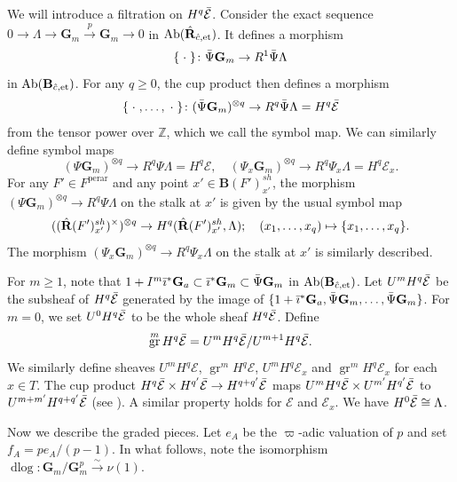 \documentclass{amsart}
\theoremstyle{remark}
\numberwithin{equation}{subsection}
\newcommand{\isomto}{\overset{\sim}{\to}}
\newcommand{\tensor}{\mathbin{\otimes}}
\newcommand{\Z}{\mathbb{Z}}
\newcommand{\et}{\mathrm{et}}
\newcommand{\Gm}{\mathbf{G}_{m}}
\newcommand{\Ga}{\mathbf{G}_{a}}
\newcommand{\perar}{\mathrm{perar}}
\newcommand{\alg}[1]{\mathbf{#1}}
\newcommand{\var}{\;\cdot\;}
\DeclareMathOperator{\Ab}{Ab}
\DeclareMathOperator{\gr}{gr}
\DeclareMathOperator{\dlog}{dlog}
\begin{document}
We will introduce a filtration on $H^{q} \Bar{\mathcal{E}}$.
Consider the exact sequence
$0 \to \Lambda \to \Gm \stackrel{p}{\to} \Gm \to 0$
in $\Ab(\Hat{\alg{R}}_{\Hat{c}, \et})$.
It defines a morphism
	\[
			\{\var\}
		\colon
			\Bar{\Psi} \Gm
		\to
			R^{1} \Bar{\Psi} \Lambda
	\]
in $\Ab(\alg{B}_{\Hat{c}, \et})$.
For any $q \ge 0$, the cup product then defines a morphism
	\[
			\{\var, \dots, \var\}
		\colon
			(\Bar{\Psi} \Gm)^{\tensor q}
		\to
			R^{q} \Bar{\Psi} \Lambda
		=
			H^{q} \Bar{\mathcal{E}}
	\]
from the tensor power over $\Z$,
which we call the symbol map.
We can similarly define symbol maps
	\[
				(\Psi \Gm)^{\tensor q}
			\to
				R^{q} \Psi \Lambda
			=
				H^{q} \mathcal{E},
		\quad
				(\Psi_{x} \Gm)^{\tensor q}
			\to
				R^{q} \Psi_{x} \Lambda
			=
				H^{q} \mathcal{E}_{x}.
	\]
For any $F' \in F^{\perar}$ and any point $x' \in \alg{B}(F')_{x'}^{sh}$,
the morphism $(\Psi \Gm)^{\tensor q} \to R^{q} \Psi \Lambda$ on the stalk at $x'$
is given by the usual symbol map
	\[
			((\Hat{\alg{R}}(F')_{x'}^{sh})^{\times})^{\tensor q}
		\to
			H^{q}(\Hat{\alg{R}}(F')_{x'}^{sh}, \Lambda);
		\quad
			(x_{1}, \dots, x_{q})
		\mapsto
			\{x_{1}, \dots, x_{q}\}.
	\]
The morphism $(\Psi_{x} \Gm)^{\tensor q} \to R^{q} \Psi_{x} \Lambda$ on the stalk at $x'$
is similarly described.

For $m \ge 1$, note that
$1 + I^{m} \Bar{\imath}^{\ast} \Ga \subset \Bar{\imath}^{\ast} \Gm \subset \Bar{\Psi} \Gm$
in $\Ab(\alg{B}_{\Hat{c}, \et})$.
Let $U^{m} H^{q} \Bar{\mathcal{E}}$ be the subsheaf of $H^{q} \Bar{\mathcal{E}}$
generated by the image of
$\{1 + \Bar{\imath}^{\ast} \Ga, \Bar{\Psi} \Gm, \dots, \Bar{\Psi} \Gm\}$.
For $m = 0$, we set $U^{0} H^{q} \Bar{\mathcal{E}}$ to be the whole sheaf $H^{q} \Bar{\mathcal{E}}$.
Define
	\[
			\gr^{m} H^{q} \Bar{\mathcal{E}}
		=
				U^{m} H^{q} \Bar{\mathcal{E}}
			/
				U^{m + 1} H^{q} \Bar{\mathcal{E}}.
	\]
We similarly define sheaves
$U^{m} H^{q} \mathcal{E}$,
$\gr^{m} H^{q} \mathcal{E}$,
$U^{m} H^{q} \mathcal{E}_{x}$
and $\gr^{m} H^{q} \mathcal{E}_{x}$
for each $x \in T$.
The cup product
$H^{q} \Bar{\mathcal{E}} \times H^{q'} \Bar{\mathcal{E}} \to H^{q + q'} \Bar{\mathcal{E}}$
maps $U^{m} H^{q} \Bar{\mathcal{E}} \times U^{m'} H^{q'} \Bar{\mathcal{E}}$ to
$U^{m + m'} H^{q + q'} \Bar{\mathcal{E}}$
(see \cite[Lemma (4.1)]{BK86}).
A similar property holds for $\mathcal{E}$ and $\mathcal{E}_{x}$.
We have $H^{0} \Bar{\mathcal{E}} \cong \Lambda$.

Now we describe the graded pieces.
Let $e_{A}$ be the $\varpi$-adic valuation of $p$
and set $f_{A} = p e_{A} / (p - 1)$.
In what follows,
note the isomorphism $\dlog \colon \Gm / \Gm^{p} \isomto \nu(1)$.
\end{document}
